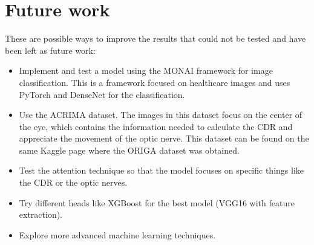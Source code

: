 \documentclass[11pt, a4paper]{article}
\begin{document}
\section{Future work}
These are possible ways to improve the results that could not be tested and have been left as future work:
\begin{itemize}
     \item Implement and test a model using the MONAI framework for image classification. This is a framework focused on healthcare images and uses PyTorch and DenseNet for the classification.
     \item Use the ACRIMA dataset. The images in this dataset focus on the center of the eye, which contains the information needed to calculate the CDR and appreciate the movement of the optic nerve. This dataset can be found on the same Kaggle page where the ORIGA dataset was obtained.
     \item Test the attention technique so that the model focuses on specific things like the CDR or the optic nerves.
     \item Try different heads like XGBoost for the best model (VGG16 with feature extraction).
    \item Explore more advanced machine learning techniques.
\end{itemize}
\end{document}
